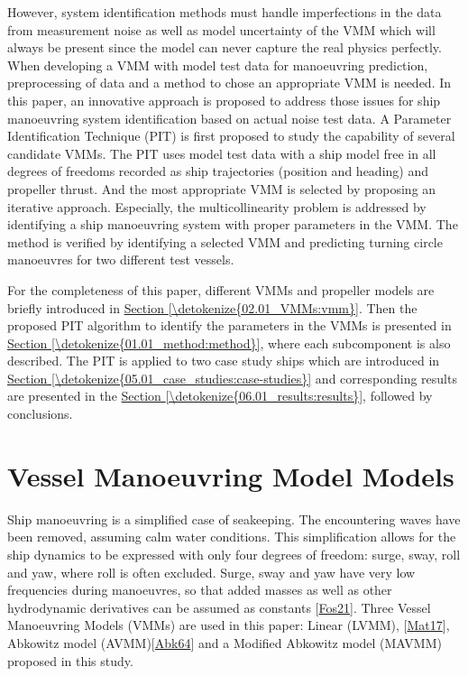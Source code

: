 \documentclass[review]{elsarticle}
\begin{document}
\sphinxAtStartPar
However, system identification methods must handle imperfections in the data from measurement noise as well as model uncertainty of the VMM which will always be present since the model can never capture the real physics perfectly. When developing a VMM with model test data for manoeuvring prediction, preprocessing of data and a method to chose an appropriate VMM is needed. In this paper, an innovative approach is proposed to address those issues for ship manoeuvring system identification based on actual noise test data. A Parameter Identification Technique (PIT) is first proposed to study the capability of several candidate VMMs. The PIT uses model test data with a ship model free in all degrees of freedoms recorded as ship trajectories (position and heading) and propeller thrust. And the most appropriate VMM is selected by proposing an iterative approach. Especially, the multicollinearity problem is addressed by identifying a ship manoeuvring system with proper parameters in the VMM.  The method is verified by identifying a selected VMM and predicting turning circle manoeuvres for two different test vessels.

\sphinxAtStartPar
For the completeness of this paper, different VMMs and propeller models are briefly introduced in \hyperref[\detokenize{02.01_VMMs:vmm}]{Section \ref{\detokenize{02.01_VMMs:vmm}}}. Then the proposed PIT algorithm to identify the parameters in the VMMs is presented in \hyperref[\detokenize{01.01_method:method}]{Section \ref{\detokenize{01.01_method:method}}}, where each subcomponent is also described. The PIT is applied to two case study ships which are introduced in \hyperref[\detokenize{05.01_case_studies:case-studies}]{Section \ref{\detokenize{05.01_case_studies:case-studies}}} and corresponding results are presented in the \hyperref[\detokenize{06.01_results:results}]{Section \ref{\detokenize{06.01_results:results}}}, followed by conclusions.


\section{Vessel Manoeuvring Model Models}
\label{\detokenize{02.01_VMMs:models}}\label{\detokenize{02.01_VMMs:vmm}}\label{\detokenize{02.01_VMMs::doc}}
\sphinxAtStartPar
Ship manoeuvring is a simplified case of seakeeping. The encountering waves have been removed, assuming calm water conditions. This simplification allows for the ship dynamics to be expressed with only four degrees of freedom: surge, sway, roll and yaw, where roll is often excluded. Surge, sway and yaw have very low frequencies during manoeuvres, so that added masses as well as other hydrodynamic derivatives can be assumed as constants {[}\hyperlink{cite.bibligraphy:id87}{Fos21}{]}. Three Vessel Manoeuvring Models (VMMs) are used in this paper: Linear (LVMM), {[}\hyperlink{cite.bibligraphy:id40}{Mat17}{]}, Abkowitz model (AVMM){[}\hyperlink{cite.bibligraphy:id25}{Abk64}{]} and a Modified Abkowitz model (MAVMM) proposed in this study.
\end{document}
